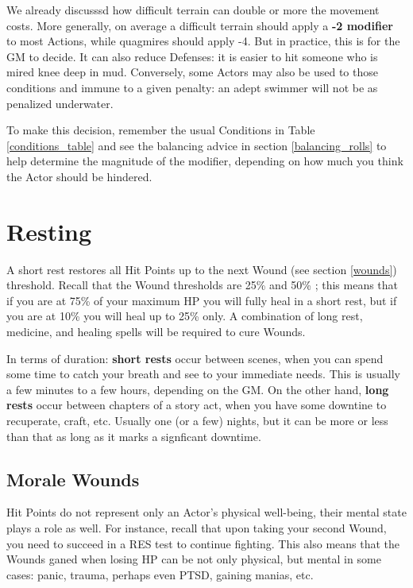 We already discusssd how difficult terrain can double or more the movement costs. More generally, on average a difficult terrain should apply a \textbf{-2 modifier} to most Actions, while quagmires should apply -4. But in practice, this is for the GM to decide. It can also reduce Defenses: it is easier to hit someone who is mired knee deep in mud. Conversely, some Actors may also be used to those conditions and immune to a given penalty: an adept swimmer will not be as penalized underwater.

To make this decision, remember the usual Conditions in Table \ref{conditions_table} and see the balancing advice in section \ref{balancing_rolls} to help determine the magnitude of the modifier, depending on how much you think the Actor should be hindered.


\section{Resting} 

A short rest restores all Hit Points up to the next Wound (see section \ref{wounds}) threshold. Recall that the Wound thresholds are 25\% and 50\% ;  this means that if you are at 75\% of your maximum HP you will fully heal in a short rest, but if you are at 10\% you will heal up to 25\% only. A combination of long rest, medicine, and healing spells will be required to cure Wounds. 

In terms of duration: \textbf{short rests} occur between scenes, when you can spend some time to catch your breath and see to your immediate needs. This is usually a few minutes to a few hours, depending on the GM. On the other hand, \textbf{long rests} occur between chapters of a story act, when you have some downtine to recuperate, craft, etc. Usually one (or a few) nights, but it can be more or less than that as long as it marks a signficant downtime.


\subsection{Morale Wounds}

Hit Points do not represent only an Actor's physical well-being, their mental state plays a role as well. For instance, recall that upon taking your second Wound, you need to succeed in a RES test to continue fighting. This also means that the Wounds ganed when losing HP can be not only physical, but mental in some cases: panic, trauma, perhaps even PTSD, gaining manias, etc. 

